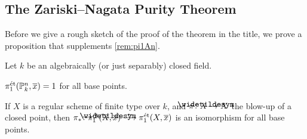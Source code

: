 \subsection{The Zariski--Nagata Purity Theorem}
Before we give a rough sketch of the proof of the theorem in the title, we prove a proposition that supplements \cref{rem:pi1An}.
\begin{prop}
	Let $k$ be an algebraically (or just separably) closed field.
	\begin{alphanumerate}
		\item $\pi_1^\et(\IP_k^n,\ov{x})=1$ for all base points.
		\item If $X$ is a regular scheme of finite type over $k$, and $\pi\colon\snake{X}\morphism X$ the blow-up of a closed point, then $\pi_*\colon\pi_1^\et(\snake{X},\ov{x})\isomorphism\pi_1^\et(X,\ov{x})$ is an isomorphism for all base points.
	\end{alphanumerate}
\end{prop}
